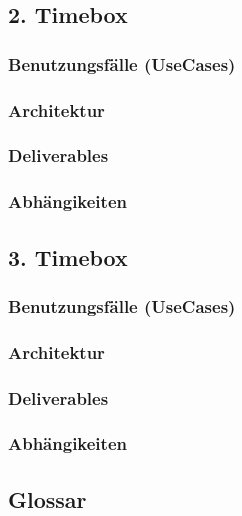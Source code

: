 \documentclass{article}
\begin{document}
\subsection{2. Timebox}
\subsubsection{Benutzungsfälle (UseCases)}
\subsubsection{Architektur}
\subsubsection{Deliverables}
\subsubsection{Abhängikeiten}

\subsection{3. Timebox}
\subsubsection{Benutzungsfälle (UseCases)}
\subsubsection{Architektur}
\subsubsection{Deliverables}
\subsubsection{Abhängikeiten}

\subsection{Glossar}
\end{document}
